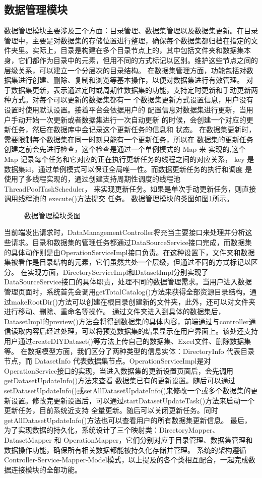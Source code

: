 \subsection{数据管理模块}
数据管理模块主要涉及三个方面：目录管理、数据集管理以及数据集更新。在目录管理中，主要是对数据集的存储位置进行整理，确保每个数据集都归档在指定的文件夹里。实际上，目录是构建在多个目录节点上的，其中包括文件夹和数据集本身，它们都作为目录中的元素，但用不同的方式标记以区别。维护这些节点之间的层级关系，可以建立一个分层次的目录结构。
在数据集管理方面，功能包括对数据集进行创建、删除、复制和浏览等基本操作，以便对数据集进行有效管理。
对于数据集更新，表示通过定时或周期性数据集的功能，支持定时更新和手动更新两种方式。对每个可以更新的数据集都有一
个数据集更新方式设置信息，用户没有设置时使用默认设置。接着平台会依据用户的
配置信息对数据集进行更新，当用户手动开始一次更新或者数据集进行一次自动更新
的时候，会创建一个对应的更新任务，然后在数据库中会记录这个更新任务的信息和
状态。
在数据集更新时，需要限制每个数据集在同一时刻只能有一个更新任务，所以在
数据集的更新任务创建之前会先进行检查，这个检查是通过一个单例模式的 Map 来
实现的,这个 Map 记录每个任务和它对应的正在执行更新任务的线程之间的对应关系，
key 是数据集id，通过单例模式可以保证全局唯一性。而数据更新任务的执行和调度
是使用了多线程实现的，通过创建支持周期性调度的线程池ThreadPoolTaskScheduler，
来实现更新任务。如果是单次手动更新任务，则直接调用线程池的 execute()方法提交
任务。
数据管理模块的类图如图\ref{fig:datamanageclass}所示。
\begin{figure}[H]
    \centering
    \caption{数据管理模块类图}
    \label{fig:datamanageclass}
\end{figure}
当前端发出请求时，DataManagementController将充当主要接口来处理并分析这些请求。目录和数据集的管理任务都通过DataSourceService接口完成，而数据集的具体动作则是由OperationServiceImpl接口负责。在这种设置下，文件夹和数据集被看作是目录结构的元素，它们虽然共处一个层级，但通过不同的方式标记以区分。
在实现方面，DirectoryServiceImpl和DatasetImpl分别实现了DataSourceService接口的具体职责，处理不同的数据管理需求。当用户进入数据管理页面时，系统首先会调用getTotalCatalog()方法来获得全部资源目录结构。通过makeRootDir()方法可以创建在根目录创建新的文件夹，此外，还可以对文件夹进行移动、删除、重命名等操作。
通过文件夹进入到具体的数据集后，DatasetImpl的preview()方法会将得到数据集的具体内容，前端通过与controller通信读取内容后经过处理，可以将预览数据集的结果显示在用户界面上。该处还支持用户通过createDIYDataset()等方法上传自己的数据集、Excel文件、删除数据集等。
在数据模型方面，我们区分了两种类型的信息实体：DirectoryInfo 代表目录节点，而 DatasetInfo 代表数据集节点。OperationServiceImpl是对OperationService接口的实现，当进入数据集的更新设置页面后，会先调用getDatasetUpdateInfo()方法来查看
数据集已有的更新设置。随后可以通过setDatasetUpdateInfo()或setAllDatasetUpdateInfo()来修改一个或多个数据集的更新设置。修改完更新设置后，可以通过startDatasetUpdateTask()方法来启动一个更新任务，目前系统近支持
全量更新。随后可以关闭更新任务。同时getAllDatasetUpdateInfo()方法也可以查看用户的所有数据集更新信息。
最后，为了实现数据的持久化，系统设计了三个映射类：DirectoryMapper、DatasetMapper 和 OperationMapper，它们分别对应于目录管理、数据集管理和数据操作功能，确保所有相关数据都能被持久化存储并管理。
系统的架构遵循Controller-Service-Mapper-Model模式，以上提及的各个类相互配合，一起完成数据连接模块的全部功能。
